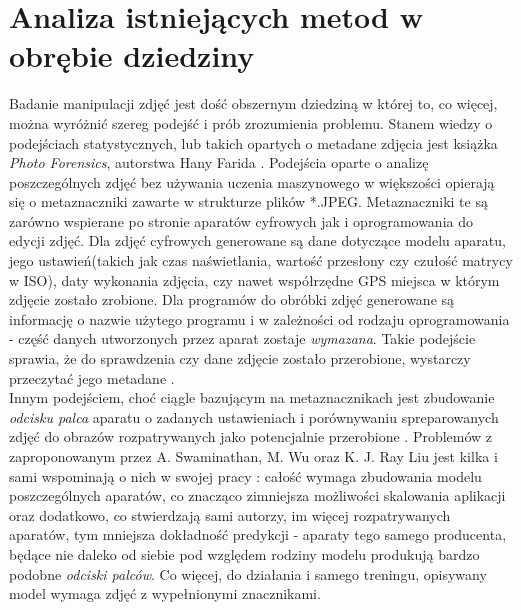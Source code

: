\chapter{Analiza istniejących metod w obrębie dziedziny}

Badanie manipulacji zdjęć jest dość obszernym dziedziną w której to, co więcej, można wyróżnić szereg podejść i prób zrozumienia problemu. Stanem wiedzy o podejściach statystycznych, lub takich opartych o metadane zdjęcia jest książka \textit{Photo Forensics}, autorstwa Hany Farida \cite{forensics}. Podejścia oparte o analizę poszczególnych zdjęć bez używania uczenia maszynowego w większości opierają się o metaznaczniki zawarte w strukturze plików *.JPEG. Metaznaczniki te są zarówno wspierane po stronie aparatów cyfrowych jak i oprogramowania do edycji zdjęć. Dla zdjęć cyfrowych generowane są dane dotyczące modelu aparatu, jego ustawień(takich jak czas naświetlania, wartość przesłony czy czułość matrycy w ISO), daty wykonania zdjęcia, czy nawet współrzędne GPS miejsca w którym zdjęcie zostało zrobione. Dla programów do obróbki zdjęć generowane są informację o nazwie użytego programu i w zależności od rodzaju oprogramowania - część danych utworzonych przez aparat zostaje \textit{wymazana}. Takie podejście sprawia, że do sprawdzenia czy dane zdjęcie zostało przerobione, wystarczy przeczytać jego metadane \cite{forensics}.\\

Innym podejściem, choć ciągle bazującym na metaznacznikach jest zbudowanie \textit{odcisku palca} aparatu o zadanych ustawieniach i porównywaniu spreparowanych zdjęć do obrazów rozpatrywanych jako potencjalnie przerobione \cite{fingerprints}. Problemów z zaproponowanym przez A. Swaminathan, M. Wu oraz K. J. Ray Liu jest kilka i sami wspominają o nich w swojej pracy \cite{fingerprints}: całość wymaga zbudowania modelu poszczególnych aparatów, co znacząco zimniejsza możliwości skalowania aplikacji oraz dodatkowo, co stwierdzają sami autorzy, im więcej rozpatrywanych aparatów, tym mniejsza dokładność predykcji - aparaty tego samego producenta, będące nie daleko od siebie pod względem rodziny modelu produkują bardzo podobne \textit{odciski palców}. Co więcej, do działania i samego treningu, opisywany model wymaga zdjęć z wypełnionymi znacznikami.\\

